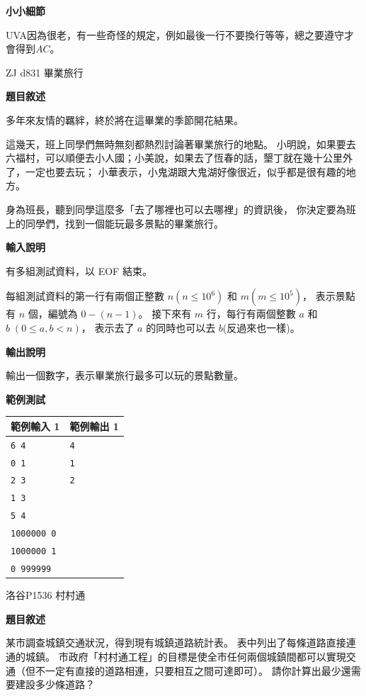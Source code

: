     \textbf{小小細節}

    UVA因為很老，有一些奇怪的規定，例如最後一行不要換行等等，總之要遵守才會得到$AC$。

    \problem ZJ d831 畢業旅行

    \textbf{題目敘述}

    多年來友情的羈絆，終於將在這畢業的季節開花結果。

    這幾天，班上同學們無時無刻都熱烈討論著畢業旅行的地點。
    小明說，如果要去六福村，可以順便去小人國；小美說，如果去了恆春的話，墾丁就在幾十公里外了，一定也要去玩；
    小華表示，小鬼湖跟大鬼湖好像很近，似乎都是很有趣的地方。

    身為班長，聽到同學這麼多「去了哪裡也可以去哪裡」的資訊後，
    你決定要為班上的同學們，找到一個能玩最多景點的畢業旅行。

    \textbf{輸入說明}

    有多組測試資料，以 EOF 結束。

    每組測試資料的第一行有兩個正整數 $n (n \le 10^6)$ 和 $m (m \le 10^5)$，
    表示景點有 $n$ 個，編號為 $0 - (n-1)$。
    接下來有 $m$ 行，每行有兩個整數 $a$ 和 $b \; (0 \le a,b<n)$，
    表示去了 $a$ 的同時也可以去 $b$(反過來也一樣)。
    
    \textbf{輸出說明}

    輸出一個數字，表示畢業旅行最多可以玩的景點數量。

    \textbf{範例測試}

    \begin{tabular}{|m{7cm}|m{7cm}|}
        \hline
        範例輸入 1 & 範例輸出 1 \\
        \hline
        \verb|6 4| & \verb|4| \\
        \verb|0 1| & \verb|1| \\
        \verb|2 3| & \verb|2| \\
        \verb|1 3| & \\
        \verb|5 4| & \\
        \verb|1000000 0| & \\
        \verb|1000000 1| & \\
        \verb|0 999999| & \\
        \hline
    \end{tabular}

    \problem 洛谷P1536 村村通

    \textbf{題目敘述}

    某市調查城鎮交通狀況，得到現有城鎮道路統計表。
    表中列出了每條道路直接連通的城鎮。
    市政府「村村通工程」的目標是使全市任何兩個城鎮間都可以實現交通（但不一定有直接的道路相連，只要相互之間可達即可）。
    請你計算出最少還需要建設多少條道路？


